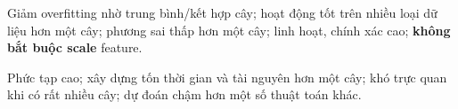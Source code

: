 \begin{tinhchat}[title={Pros}]
Giảm overfitting nhờ trung bình/kết hợp cây; hoạt động tốt trên nhiều loại dữ liệu hơn một cây; phương sai thấp hơn một cây; linh hoạt, chính xác cao; \textbf{không bắt buộc scale} feature.
\end{tinhchat}

\begin{luuy}[title={Cons}]
Phức tạp cao; xây dựng tốn thời gian và tài nguyên hơn một cây; khó trực quan khi có rất nhiều cây; dự đoán chậm hơn một số thuật toán khác.
\end{luuy}
